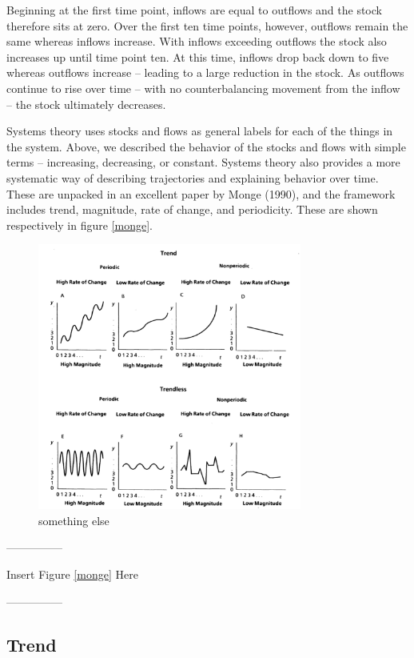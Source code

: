 \documentclass[english,,man]{apa6}
\theoremstyle{definition}
\theoremstyle{definition}
\theoremstyle{definition}
\theoremstyle{remark}
\begin{document}
\noindent Beginning at the first time point, inflows are equal to
outflows and the stock therefore sits at zero. Over the first ten time
points, however, outflows remain the same whereas inflows increase. With
inflows exceeding outflows the stock also increases up until time point
ten. At this time, inflows drop back down to five whereas outflows
increase -- leading to a large reduction in the stock. As outflows
continue to rise over time -- with no counterbalancing movement from the
inflow -- the stock ultimately decreases.

Systems theory uses stocks and flows as general labels for each of the
things in the system. Above, we described the behavior of the stocks and
flows with simple terms -- increasing, decreasing, or constant. Systems
theory also provides a more systematic way of describing trajectories
and explaining behavior over time. These are unpacked in an excellent
paper by Monge (1990), and the framework includes trend, magnitude, rate
of change, and periodicity. These are shown respectively in figure
\ref{monge}.

\begin{figure}
\includegraphics[width=3.42in]{figs/fig_monge1} \caption{something else\label{monge}}\label{fig:unnamed-chunk-6}
\end{figure}

\begin{center}

---------------

Insert Figure \ref{monge} Here

---------------

\end{center}

\hypertarget{trend}{%
\subsection{Trend}\label{trend}}
\end{document}
